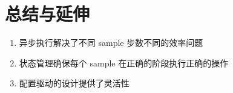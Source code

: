 \section{总结与延伸}
\begin{enumerate}
  \item 异步执行解决了不同 sample 步数不同的效率问题
  \item 状态管理确保每个 sample 在正确的阶段执行正确的操作
  \item 配置驱动的设计提供了灵活性
\end{enumerate}

